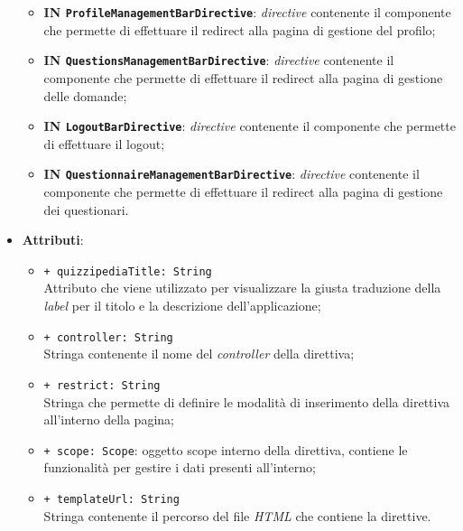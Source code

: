 \begin{itemize}
\begin{itemize}
		\item \textbf{IN \texttt{ProfileManagementBarDirective}}: \textit{directive} contenente il componente che permette di effettuare il redirect alla pagina di gestione del profilo;
		\item \textbf{IN \texttt{QuestionsManagementBarDirective}}: \textit{directive} contenente il componente che permette di effettuare il redirect alla pagina di gestione delle domande;
		\item \textbf{IN \texttt{LogoutBarDirective}}: \textit{directive} contenente il componente che permette di effettuare il logout;
		\item \textbf{IN \texttt{QuestionnaireManagementBarDirective}}: \textit{directive} contenente il componente che permette di effettuare il redirect alla pagina di gestione dei questionari.
	\end{itemize}
	\item \textbf{Attributi}: 
	\begin{itemize}
		\item \texttt{+ quizzipediaTitle: String} \\ Attributo che viene utilizzato per visualizzare la giusta traduzione della \textit{label} per il titolo e la descrizione dell'applicazione;
		\item \texttt{+ controller: String} \\ Stringa contenente il nome del \textit{controller} della direttiva;
		\item \texttt{+ restrict: String} \\ Stringa che permette di definire le modalità di inserimento della direttiva all'interno della pagina;
		\item \texttt{+ scope: Scope}: oggetto scope interno della direttiva, contiene le funzionalità per gestire i dati presenti all'interno;
		\item \texttt{+ templateUrl: String} \\ Stringa contenente il percorso del file \textit{HTML} che contiene la direttive.
	\end{itemize}
\end{itemize}
